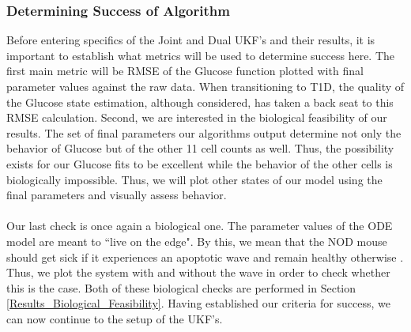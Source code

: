 \subsubsection{Determining Success of Algorithm}
Before entering specifics of the Joint and Dual UKF's and their results, it is important to establish what metrics will be used to determine success here. The first main metric will be RMSE of the Glucose function plotted with final parameter values against the raw data. When transitioning to T1D, the quality of the Glucose state estimation, although considered, has taken a back seat to this RMSE calculation. Second, we are interested in the biological feasibility of our results. The set of final parameters our algorithms output determine not only the behavior of Glucose but of the other 11 cell counts as well. Thus, the possibility exists for our Glucose fits to be excellent while the behavior of the other cells is biologically impossible. Thus, we will plot other states of our model using the final parameters and visually assess behavior. \\
\\
Our last check is once again a biological one. The parameter values of the ODE model are meant to ``live on the edge". By this, we mean that the NOD mouse should get sick if it experiences an apoptotic wave and remain healthy otherwise \cite{shtylla2019mathematical}. Thus, we plot the system with and without the wave in order to check whether this is the case. Both of these biological checks are performed in Section \ref{Results_Biological_Feasibility}. Having established our criteria for success, we can now continue to the setup of the UKF's.


